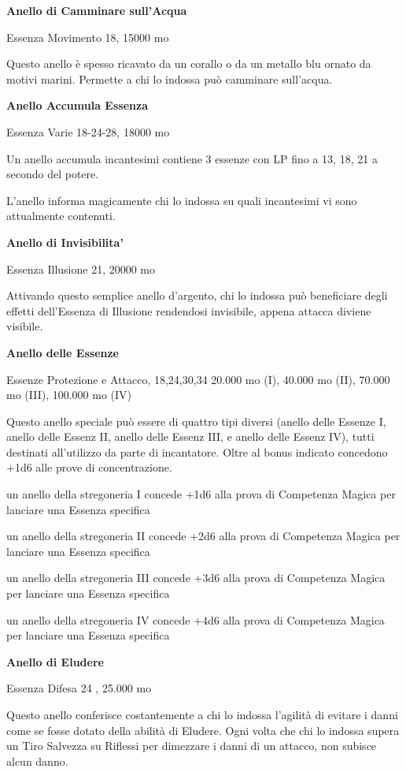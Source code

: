 \documentclass[a4paper,11pt,twoside,openany]{book}
\begin{document}
\textbf{Anello di Camminare sull'Acqua}

Essenza Movimento 18, 15000 mo

Questo anello è spesso ricavato da un corallo o da un metallo blu ornato da motivi marini. Permette a chi lo indossa può camminare sull'acqua.

\textbf{Anello Accumula Essenza}

Essenza Varie 18-24-28, 18000 mo

Un anello accumula incantesimi contiene 3 essenze con LP fino a 13, 18, 21 a secondo del potere.

L'anello informa magicamente chi lo indossa su quali incantesimi vi sono attualmente contenuti.

\textbf{Anello di Invisibilita'}

Essenza Illusione 21, 20000 mo

Attivando questo semplice anello d'argento, chi lo indossa può beneficiare degli effetti dell'Essenza di Illusione rendendosi invisibile, appena attacca diviene visibile.

\textbf{Anello delle Essenze}

Essenze Protezione e Attacco, 18,24,30,34 20.000 mo (I), 40.000 mo
(II), 70.000 mo (III), 100.000 mo (IV)

Questo anello speciale può essere di quattro tipi diversi (anello delle Essenze I, anello delle Essenz II, anello delle Essenz III, e anello delle Essenz IV), tutti destinati all'utilizzo da parte di incantatore. Oltre al bonus indicato concedono +1d6 alle prove di concentrazione.

un anello della stregoneria I concede +1d6 alla prova di Competenza Magica per lanciare una Essenza specifica

un anello della stregoneria II concede +2d6 alla prova di Competenza Magica per lanciare una Essenza specifica

un anello della stregoneria III concede +3d6 alla prova di Competenza Magica per lanciare una Essenza specifica

un anello della stregoneria IV concede +4d6 alla prova di Competenza Magica per lanciare una Essenza specifica

\textbf{Anello di Eludere}

Essenza Difesa 24 , 25.000 mo

Questo anello conferisce costantemente a chi lo indossa l'agilità di evitare i danni come se fosse dotato della abilità di Eludere. Ogni volta che chi lo indossa supera un Tiro Salvezza su Riflessi per dimezzare i danni di un attacco, non subisce alcun danno.
\end{document}
